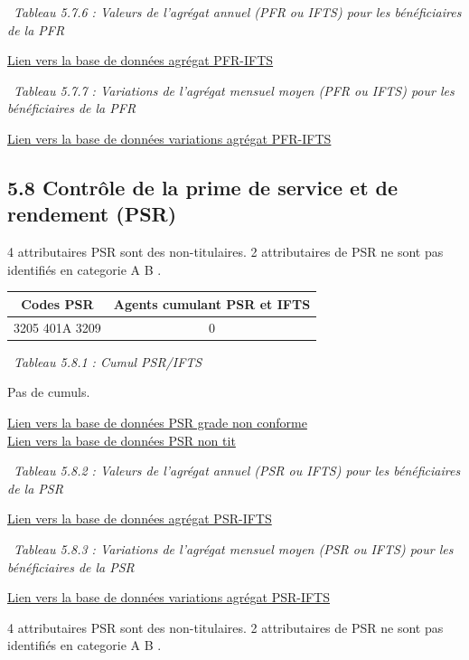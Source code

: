 ~\emph{Tableau 5.7.6 : Valeurs de l'agrégat annuel (PFR ou IFTS) pour
les bénéficiaires de la PFR}

\href{../Bases/Remunerations/beneficiaires.PFR.IFTS.csv}{Lien vers la base
de données agrégat PFR-IFTS}

~\emph{Tableau 5.7.7 : Variations de l'agrégat mensuel moyen (PFR ou
IFTS) pour les bénéficiaires de la PFR}

\href{../Bases/Remunerations/beneficiaires.PFR.IFTS.Variation.csv}{Lien
vers la base de données variations agrégat PFR-IFTS}

\hypertarget{controle-de-la-prime-de-service-et-de-rendement-psr}{%
\subsection{5.8 Contrôle de la prime de service et de rendement
(PSR)}\label{controle-de-la-prime-de-service-et-de-rendement-psr}}

4 attributaires PSR sont des non-titulaires. 2 attributaires de PSR ne
sont pas identifiés en categorie A B .

\begin{longtable}[]{@{}cc@{}}
\toprule
Codes PSR & Agents cumulant PSR et IFTS\tabularnewline
\midrule
\endhead
3205 401A 3209 & 0\tabularnewline
\bottomrule
\end{longtable}

~\emph{Tableau 5.8.1 : Cumul PSR/IFTS}

Pas de cumuls.

\href{../Bases/Reglementation/PSR.non.catAB.csv}{Lien vers la base de
données PSR grade non conforme}\\
\href{../Bases/Reglementation/PSR.non.tit.csv}{Lien vers la base de données
PSR non tit}

~\emph{Tableau 5.8.2 : Valeurs de l'agrégat annuel (PSR ou IFTS) pour
les bénéficiaires de la PSR}

\href{../Bases/Remunerations/beneficiaires.PSR.IFTS.csv}{Lien vers la base
de données agrégat PSR-IFTS}

~\emph{Tableau 5.8.3 : Variations de l'agrégat mensuel moyen (PSR ou
IFTS) pour les bénéficiaires de la PSR}

\href{../Bases/Remunerations/beneficiaires.PSR.IFTS.Variation.csv}{Lien
vers la base de données variations agrégat PSR-IFTS}

4 attributaires PSR sont des non-titulaires. 2 attributaires de PSR ne
sont pas identifiés en categorie A B .

